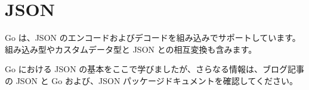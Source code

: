 \section{JSON}

Go は、JSON のエンコードおよびデコードを組み込みでサポートしています。組み込み型やカスタムデータ型と JSON との相互変換も含みます。




Go における JSON の基本をここで学びましたが、さらなる情報は、ブログ記事の JSON と Go および、JSON パッケージドキュメントを確認してください。